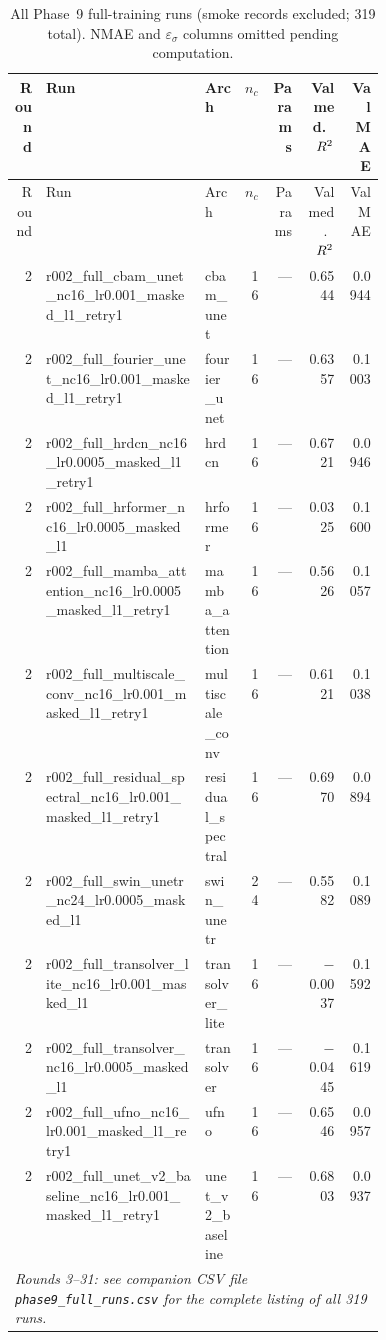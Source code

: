 ﻿\documentclass[preprint,12pt,authoryear]{elsarticle}
\newcommand{\rTwo}{R\textsuperscript{2}}
\begin{document}
\begin{landscape}
\scriptsize
\begin{longtable}{r p{0.43\linewidth} l r r r r}
\caption{All Phase~9 full-training runs (smoke records excluded; 319 total). NMAE and $\varepsilon_{\sigma}$ columns omitted pending computation.}\label{tab:fullruns}\\
\toprule
Round & Run & Arch & $n_c$ & Params & Val med.\ $\rTwo{}$ & Val MAE\\
\midrule
\endfirsthead
\toprule
Round & Run & Arch & $n_c$ & Params & Val med.\ $\rTwo{}$ & Val MAE\\
\midrule
\endhead
2 & r002\_full\_cbam\_unet\_nc16\_lr0.001\_masked\_l1\_retry1 & cbam\_unet & 16 & --- & 0.6544 & 0.0944 \\
2 & r002\_full\_fourier\_unet\_nc16\_lr0.001\_masked\_l1\_retry1 & fourier\_unet & 16 & --- & 0.6357 & 0.1003 \\
2 & r002\_full\_hrdcn\_nc16\_lr0.0005\_masked\_l1\_retry1 & hrdcn & 16 & --- & 0.6721 & 0.0946 \\
2 & r002\_full\_hrformer\_nc16\_lr0.0005\_masked\_l1 & hrformer & 16 & --- & 0.0325 & 0.1600 \\
2 & r002\_full\_mamba\_attention\_nc16\_lr0.0005\_masked\_l1\_retry1 & mamba\_attention & 16 & --- & 0.5626 & 0.1057 \\
2 & r002\_full\_multiscale\_conv\_nc16\_lr0.001\_masked\_l1\_retry1 & multiscale\_conv & 16 & --- & 0.6121 & 0.1038 \\
2 & r002\_full\_residual\_spectral\_nc16\_lr0.001\_masked\_l1\_retry1 & residual\_spectral & 16 & --- & 0.6970 & 0.0894 \\
2 & r002\_full\_swin\_unetr\_nc24\_lr0.0005\_masked\_l1 & swin\_unetr & 24 & --- & 0.5582 & 0.1089 \\
2 & r002\_full\_transolver\_lite\_nc16\_lr0.001\_masked\_l1 & transolver\_lite & 16 & --- & $-$0.0037 & 0.1592 \\
2 & r002\_full\_transolver\_nc16\_lr0.0005\_masked\_l1 & transolver & 16 & --- & $-$0.0445 & 0.1619 \\
2 & r002\_full\_ufno\_nc16\_lr0.001\_masked\_l1\_retry1 & ufno & 16 & --- & 0.6546 & 0.0957 \\
2 & r002\_full\_unet\_v2\_baseline\_nc16\_lr0.001\_masked\_l1\_retry1 & unet\_v2\_baseline & 16 & --- & 0.6803 & 0.0937 \\
\midrule
\multicolumn{7}{l}{\emph{Rounds 3--31: see companion CSV file \texttt{phase9\_full\_runs.csv} for the complete listing of all 319 runs.}}\\
\bottomrule
\end{longtable}
\end{landscape}
\end{document}
